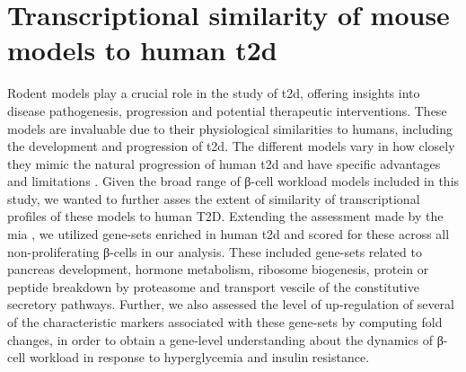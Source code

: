 \clearpage

\section{Transcriptional similarity of mouse models to human \gls{t2d}}
\label{sec:chp3_T2Dgenes}
Rodent models play a crucial role in the study of \gls{t2d}, offering insights into disease pathogenesis, progression and potential therapeutic interventions. These models are invaluable due to their physiological similarities to humans, including the development and progression of \gls{t2d}. The different models vary in how closely they mimic the natural progression of human \gls{t2d} and have specific advantages and limitations \textbf{\cite{kleinert_animal_2018, singh_animal_2024}}. Given the broad range of β-cell workload models included in this study, we wanted to further asses the extent of similarity of transcriptional profiles of these models to human T2D. Extending the assessment made by the \gls{mia} \textbf{\cite{hrovatin_delineating_2023}}, we utilized gene-sets enriched in human \gls{t2d} and scored for these across all non-proliferating β-cells in our analysis. These included gene-sets related to pancreas development, hormone metabolism, ribosome biogenesis, protein or peptide breakdown by proteasome and transport vescile of the constitutive secretory pathways. Further, we also assessed the level of up-regulation of several of the characteristic markers associated with these gene-sets by computing fold changes, in order to obtain a gene-level understanding about the dynamics of β-cell workload in response to hyperglycemia and insulin resistance.    %

